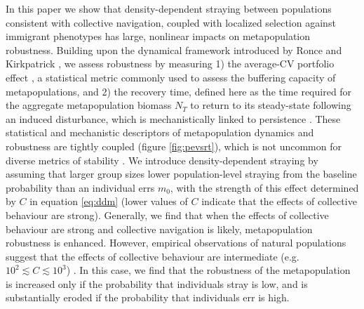 \documentclass{revtex4}
\begin{document}
In this paper we show that density-dependent straying between populations consistent with collective navigation, coupled with localized selection against immigrant phenotypes has large, nonlinear impacts on metapopulation robustness.
Building upon the dynamical framework introduced by Ronce and Kirkpatrick \citep{Ronce:2001dp}, we assess robustness by measuring 
1) the average-CV portfolio effect \citep{Anderson:2013gb,Anonymous:2015gf}, a statistical metric commonly used to assess the buffering capacity of metapopulations, and
2) the recovery time, defined here as the time required for the aggregate metapopulation biomass $N_T$ to return to its steady-state following an induced disturbance, which is mechanistically linked to persistence \citep{Ovaskainen:2002il}.
These statistical and mechanistic descriptors of metapopulation dynamics and robustness are tightly coupled (figure \ref{fig:pevsrt}), which is not uncommon for diverse metrics of stability \citep{Donohue:2013iu}.
We introduce density-dependent straying by assuming that larger group sizes lower population-level straying from the baseline probability than an individual errs $m_0$, with the strength of this effect determined by $C$ in equation \ref{eq:ddm} (lower values of $C$ indicate that the effects of collective behaviour are strong).
Generally, we find that when the effects of collective behaviour are strong and collective navigation is likely, metapopulation robustness is enhanced.
However, empirical observations of natural populations suggest that the effects of collective behaviour are intermediate (e.g. $10^{2} \lesssim C \lesssim 10^3$) \citep{Berdahl:2014bl,Berdahl:2016dx}.
In this case, we find that the robustness of the metapopulation is increased only if the probability that individuals stray is low, and is substantially eroded if the probability that individuals err is high.


\end{document}
